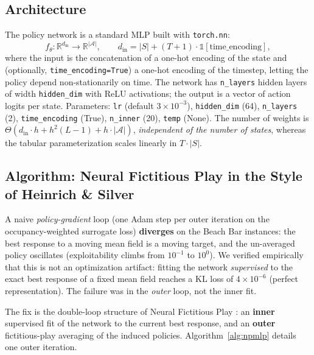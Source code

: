 \documentclass[11pt,a4paper]{article}
\begin{document}
\subsection{Architecture}
The policy network is a standard MLP built with \texttt{torch.nn}:
\begin{equation}
  f_\theta : \mathbb{R}^{d_{\mathrm{in}}} \to \mathbb{R}^{|\mathcal{A}|}, \qquad
  d_{\mathrm{in}} = |S| + (T{+}1) \cdot \mathbb{1}[\text{time\_encoding}],
\end{equation}
where the input is the concatenation of a one-hot encoding of the state and
(optionally, \texttt{time\_encoding=True}) a one-hot encoding of the
timestep, letting the policy depend non-stationarily on time. The network has
\texttt{n\_layers} hidden layers of width \texttt{hidden\_dim} with ReLU
activations; the output is a vector of action logits per state. Parameters:
\texttt{lr} (default $3 \times 10^{-3}$), \texttt{hidden\_dim} (64),
\texttt{n\_layers} (2), \texttt{time\_encoding} (True), \texttt{n\_inner}
(20), \texttt{temp} (None). The number of weights is $\Theta(d_{\mathrm{in}}
\cdot h + h^2 (L{-}1) + h \cdot |\mathcal{A}|)$, \emph{independent of the
number of states}, whereas the tabular parameterization scales linearly in
$T \cdot |S|$.

\subsection{Algorithm: Neural Fictitious Play in the Style of Heinrich \& Silver}\label{sec:nfp-mlp}
A naive \emph{policy-gradient} loop (one Adam step per outer iteration on the
occupancy-weighted surrogate loss) \textbf{diverges} on the Beach Bar
instances: the best response to a moving mean field is a moving target, and
the un-averaged policy oscillates (exploitability climbs from $10^{-1}$ to
$10^{0}$). We verified empirically that this is not an optimization artifact:
fitting the network \emph{supervised} to the exact best response of a fixed
mean field reaches a KL loss of $4 \times 10^{-6}$ (perfect representation).
The failure was in the \emph{outer} loop, not the inner fit.

The fix is the double-loop structure of Neural Fictitious Play
\cite{heinrich2016}: an \textbf{inner} supervised fit of the network to the
current best response, and an \textbf{outer} fictitious-play averaging
\cite{perrin2020} of the induced policies. Algorithm~\ref{alg:npmlp} details
one outer iteration.
\end{document}
